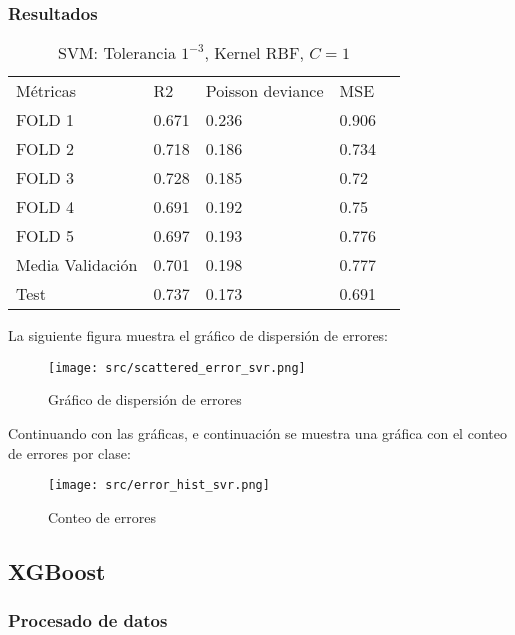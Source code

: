 \subsubsection{Resultados}
\begin{table}[H]
	  \centering
	\begin{tabular}{|l|l|l|l|l}
		\cline{1-4}
		Métricas         & R2      & Poisson deviance & MSE   \\ \cline{1-4}
		FOLD 1   		 & 0.671   & 0.236            & 0.906 \\ \cline {1-4}
		FOLD 2   		 & 0.718   & 0.186            & 0.734 \\ \cline {1-4}
		FOLD 3   		 & 0.728   & 0.185            & 0.72  \\ \cline {1-4}
		FOLD 4   		 & 0.691   & 0.192            & 0.75  \\ \cline {1-4}
		FOLD 5   		 & 0.697   & 0.193            & 0.776 \\ \cline {1-4}
		Media Validación & 0.701   & 0.198            & 0.777 \\ \cline {1-4}
		Test             & 0.737   & 0.173            & 0.691 \\ \cline {1-4}
	\end{tabular}
\caption{SVM: Tolerancia $1^{-3}$, Kernel RBF, $C=1$}
\label{tab:svm_res}
\end{table}
La siguiente figura muestra el gráfico de dispersión de errores:
\begin{figure}[H]
	\centering
	\texttt{[image: src/scattered\_error\_svr.png]}
	\caption{Gráfico de dispersión de errores}
	\label{fig:svr_scattered}
\end{figure}
Continuando con las gráficas, e continuación se muestra una gráfica con el conteo de errores por clase:\\
\linebreak 
\begin{figure}[H]
	\centering
	\texttt{[image: src/error\_hist\_svr.png]}
	\caption{Conteo de errores}
	\label{fig:svr_error_plot}
\end{figure}
\subsection{XGBoost}
\subsubsection{Procesado de datos}
